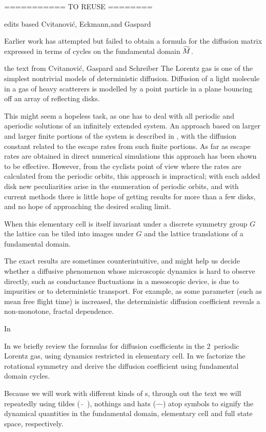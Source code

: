 \bigskip
=========== TO REUSE ========

    {edits based Cvitanovi\'c,  Eckmann,and Gaspard}

Earlier work has attempted but failed to obtain a formula
for the diffusion matrix expressed in terms of cycles on the fundamental
domain ${\widetilde M}$.


\bigskip

    {the text from Cvitanovi\'c, Gaspard and Schreiber}
The Lorentz gas is one of the simplest nontrivial models
of deterministic diffusion.
Diffusion of a light molecule in a gas of heavy scatterers
is modelled
by a point particle in a plane bouncing off an array of reflecting disks.

This might seem a hopeless task, as one
has to deal with all periodic and aperiodic
solutions of an infinitely extended system. An
approach based on larger and larger finite portions of the system is described
in , with the diffusion constant related to
the escape rates from such finite portions.
As far as escape rates are obtained in direct numerical simulations
this approach has been shown to be effective.
However, from the cyclists point of view
where the rates are calculated from the periodic orbits,
this approach is impractical; with each added disk new peculiarities arise
in the enumeration of periodic orbits, and with current
methods there is little hope of getting results for more than a few disks,
and no hope of approaching the desired scaling limit.

When this elementary cell is itself invariant under a discrete symmetry
group $G$ the lattice can be tiled into images under $G$ and the lattice
translations of a fundamental domain.

The exact results are sometimes counterintuitive, and might help us
decide whether a diffusive phenomenon whose microscopic dynamics is hard
to observe directly, such as conductance fluctuations in a mesoscopic
device, is due to impurities or to deterministic transport. For example,
as some parameter (such as mean free flight time) is increased, the
deterministic diffusion coefficient reveals a non-monotone, fractal
dependence.

In 

In 
we briefly review the formulas for diffusion
coefficients in the $2$\dmn\ periodic Lorentz gas, using dynamics
restricted in elementary cell.
In  we
factorize the rotational symmetry and derive the diffusion coefficient
using fundamental domain cycles.

Because we will work with different
kinds of \statesp s, through out the text we will repeatedly using tildes
($\tilde{\quad}$), nothings and hats ($\hat{\quad}$) atop symbols to
signify the dynamical quantities in the fundamental domain, elementary
cell and full state space, respectively.
